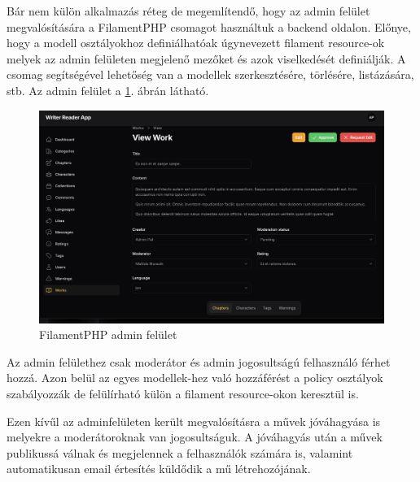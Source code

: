 Bár nem külön alkalmazás réteg de megemlítendő, hogy az admin felület megvalósítására a FilamentPHP csomagot használtuk a backend oldalon. Előnye, hogy a modell osztályokhoz definiálhatóak úgynevezett filament resource-ok melyek az admin felületen megjelenő mezőket és azok viselkedését definiálják. A csomag segítségével lehetőség van a modellek szerkesztésére, törlésére, listázására, stb. Az admin felület a \ref{fig:admin}. ábrán látható.

\begin{figure}[H]
    \centering
    \includegraphics[scale=0.25]{./figures/admin-panel.png}
    \caption{FilamentPHP admin felület}
    \label{fig:admin}
\end{figure}

Az admin felülethez csak moderátor és admin jogosultságú felhasználó férhet hozzá. Azon belül az egyes modellek-hez való hozzáférést a policy osztályok szabályozzák de felülírható külön a filament resource-okon keresztül is.

Ezen kívűl az adminfelületen került megvalósításra a művek jóváhagyása is melyekre a moderátoroknak van jogosultságuk. A jóváhagyás után a művek publikussá válnak és megjelennek a felhasználók számára is, valamint automatikusan email értesítés küldődik a mű létrehozójának.